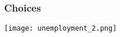 \documentclass[aspectratio=169]{beamer}
\theoremstyle{principle}
\begin{document}
%


\begin{frame}
\frametitle{Choices}
\begin{center}
\texttt{[image: unemployment\_2.png]}
\end{center}

\end{frame}
\end{document}
